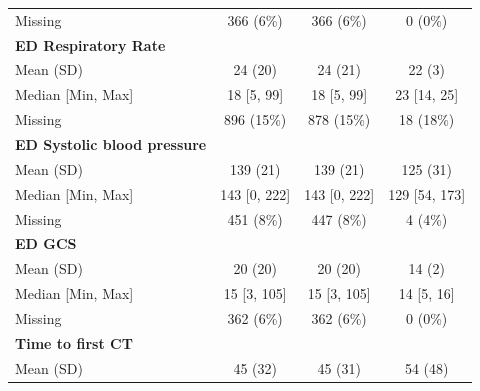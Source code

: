 \documentclass[12pt, a4paper]{article}
\begin{document}
\begin{appendices}
\begin{table}[t!]
{\begin{tabular}{lccc}
				\hspace{3mm}Missing                           & 366 (6\%)         & 366 (6\%)         & 0 (0\%)       \\
				\textbf{ED Respiratory Rate}                  &                   &                   &               \\
				\hspace{3mm}Mean (SD)                         & 24 (20)           & 24 (21)           & 22 (3)        \\
				\hspace{3mm}Median [Min, Max]                 & 18 [5, 99]        & 18 [5, 99]        & 23 [14, 25]   \\
				\hspace{3mm}Missing                           & 896 (15\%)        & 878 (15\%)        & 18 (18\%)     \\
				\textbf{ED Systolic blood pressure}           &                   &                   &               \\
				\hspace{3mm}Mean (SD)                         & 139 (21)          & 139 (21)          & 125 (31)      \\
				\hspace{3mm}Median [Min, Max]                 & 143 [0, 222]      & 143 [0, 222]      & 129 [54, 173] \\
				\hspace{3mm}Missing                           & 451 (8\%)         & 447 (8\%)         & 4 (4\%)       \\
				\textbf{ED GCS}                               &                   &                   &               \\
				\hspace{3mm}Mean (SD)                         & 20 (20)           & 20 (20)           & 14 (2)        \\
				\hspace{3mm}Median [Min, Max]                 & 15 [3, 105]       & 15 [3, 105]       & 14 [5, 16]    \\
				\hspace{3mm}Missing                           & 362 (6\%)         & 362 (6\%)         & 0 (0\%)       \\
				\textbf{Time to first CT}                     &                   &                   &               \\
				\hspace{3mm}Mean (SD)                         & 45 (32)           & 45 (31)           & 54 (48)       \\

\end{tabular}}
\end{table}
\end{appendices}
\end{document}
